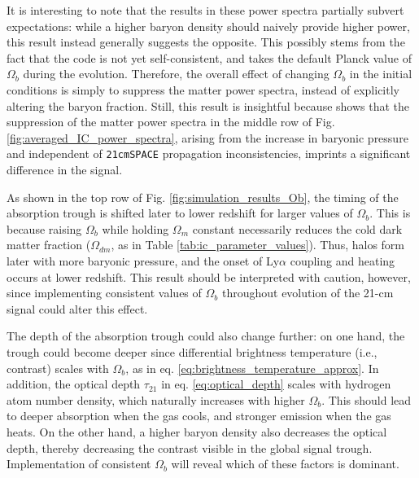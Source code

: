 \documentclass[floats,floatfix,showpacs,amssymb,prd,superscriptaddress,nofootinbib]{revtex4-2} %
\newcommand{\code}{\texttt}
\begin{document}
It is interesting to note that the results in these power spectra partially subvert expectations: while a higher baryon density should naively provide higher power, this result instead generally suggests the opposite. This possibly stems from the fact that the code is not yet self-consistent, and takes the default Planck value of $\Omega_b$ during the evolution. Therefore, the overall effect of changing $\Omega_b$ in the initial conditions is simply to suppress the matter power spectra, instead of explicitly altering the baryon fraction. Still, this result is insightful because shows that the suppression of the matter power spectra in the middle row of Fig. \ref{fig:averaged_IC_power_spectra}, arising from the increase in baryonic pressure and independent of \code{21cmSPACE} propagation inconsistencies, imprints a significant difference in the signal.  


As shown in the top row of Fig. \ref{fig:simulation_results_Ob}, the timing of the absorption trough is shifted later to lower redshift for larger values of $\Omega_b$. This is because raising $\Omega_b$ while holding $\Omega_m$ constant necessarily reduces the cold dark matter fraction ($\Omega_{dm}$, as in Table \ref{tab:ic_parameter_values}). Thus, halos form later with more baryonic pressure, and the onset of Ly$\alpha$ coupling and heating occurs at lower redshift. This result should be interpreted with caution, however, since implementing consistent values of $\Omega_b$ throughout evolution of the 21-cm signal could alter this effect. 

The depth of the absorption trough could also change further: on one hand, the trough could become deeper since differential brightness temperature (i.e., contrast) scales with $\Omega_b$, as in eq. \ref{eq:brightness_temperature_approx}. In addition, the optical depth $\tau_{21}$ in eq. \ref{eq:optical_depth} scales with hydrogen atom number density, which naturally increases with higher $\Omega_b$. This should lead to deeper absorption when the gas cools, and stronger emission when the gas heats. On the other hand,  a higher baryon density also decreases the optical depth, thereby decreasing the contrast visible in the global signal trough. Implementation of consistent $\Omega_b$ will reveal which of these factors is dominant.
\end{document}
